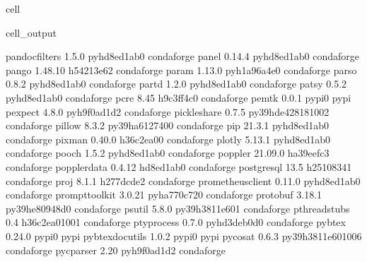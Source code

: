 \documentclass[letterpaper,table,10pt,english]{jupyterBook}
\begin{document}
\begin{sphinxuseclass}{cell}
\begin{sphinxVerbatimOutput}
\begin{sphinxuseclass}{cell_output}
\begin{sphinxVerbatim}[commandchars=\\\{\}]
pandocfilters             1.5.0              pyhd8ed1ab\PYGZus{}0    conda\PYGZhy{}forge
panel                     0.14.4             pyhd8ed1ab\PYGZus{}0    conda\PYGZhy{}forge
pango                     1.48.10              h54213e6\PYGZus{}2    conda\PYGZhy{}forge
param                     1.13.0             pyh1a96a4e\PYGZus{}0    conda\PYGZhy{}forge
parso                     0.8.2              pyhd8ed1ab\PYGZus{}0    conda\PYGZhy{}forge
partd                     1.2.0              pyhd8ed1ab\PYGZus{}0    conda\PYGZhy{}forge
patsy                     0.5.2              pyhd8ed1ab\PYGZus{}0    conda\PYGZhy{}forge
pcre                      8.45                 h9c3ff4c\PYGZus{}0    conda\PYGZhy{}forge
pemtk                     0.0.1                    pypi\PYGZus{}0    pypi
pexpect                   4.8.0              pyh9f0ad1d\PYGZus{}2    conda\PYGZhy{}forge
pickleshare               0.7.5           py39hde42818\PYGZus{}1002    conda\PYGZhy{}forge
pillow                    8.3.2            py39ha612740\PYGZus{}0    conda\PYGZhy{}forge
pip                       21.3.1             pyhd8ed1ab\PYGZus{}0    conda\PYGZhy{}forge
pixman                    0.40.0               h36c2ea0\PYGZus{}0    conda\PYGZhy{}forge
plotly                    5.13.1             pyhd8ed1ab\PYGZus{}0    conda\PYGZhy{}forge
pooch                     1.5.2              pyhd8ed1ab\PYGZus{}0    conda\PYGZhy{}forge
poppler                   21.09.0              ha39eefc\PYGZus{}3    conda\PYGZhy{}forge
poppler\PYGZhy{}data              0.4.12               hd8ed1ab\PYGZus{}0    conda\PYGZhy{}forge
postgresql                13.5                 h2510834\PYGZus{}1    conda\PYGZhy{}forge
proj                      8.1.1                h277dcde\PYGZus{}2    conda\PYGZhy{}forge
prometheus\PYGZus{}client         0.11.0             pyhd8ed1ab\PYGZus{}0    conda\PYGZhy{}forge
prompt\PYGZhy{}toolkit            3.0.21             pyha770c72\PYGZus{}0    conda\PYGZhy{}forge
protobuf                  3.18.1           py39he80948d\PYGZus{}0    conda\PYGZhy{}forge
psutil                    5.8.0            py39h3811e60\PYGZus{}1    conda\PYGZhy{}forge
pthread\PYGZhy{}stubs             0.4               h36c2ea0\PYGZus{}1001    conda\PYGZhy{}forge
ptyprocess                0.7.0              pyhd3deb0d\PYGZus{}0    conda\PYGZhy{}forge
pybtex                    0.24.0                   pypi\PYGZus{}0    pypi
pybtex\PYGZhy{}docutils           1.0.2                    pypi\PYGZus{}0    pypi
pycosat                   0.6.3           py39h3811e60\PYGZus{}1006    conda\PYGZhy{}forge
pycparser                 2.20               pyh9f0ad1d\PYGZus{}2    conda\PYGZhy{}forge

\end{sphinxVerbatim}
\end{sphinxuseclass}
\end{sphinxVerbatimOutput}
\end{sphinxuseclass}
\end{document}
